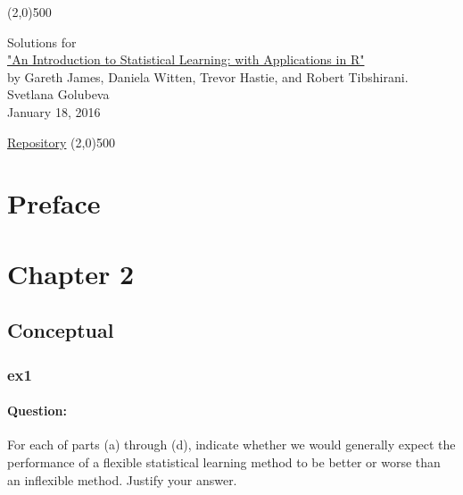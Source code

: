 \documentclass[a4paper,12pt,titlepage]{article} %
\begin{document}
\begin{titlepage}

\begin{center}
	\line(2,0){500}
\end{center}

\vspace{60pt}

\begin{center}	
	{\Large{Solutions for}}\\
	\vspace{20pt}
	\href{http://www.springer.com/us/book/9781461471370}{\Huge{"An Introduction to Statistical Learning: with Applications in R"}}\\
	\vspace{20pt}
	{\LARGE{by Gareth James, Daniela Witten, Trevor Hastie, and Robert Tibshirani.}}\\
	\vspace{20pt}
	Svetlana Golubeva\\
	\vspace{20pt}
	January 18, 2016
\end{center}

\vspace{\fill}
\begin{center}
	\href{https://github.com/attillax/ISL}{Repository}
	\line(2,0){500}
\end{center}

\end{titlepage}

\tableofcontents
\newpage
\section{Preface}

\newpage
\section{Chapter 2}
\subsection{Conceptual}
\subsubsection{ex1}
\paragraph{Question:} For each of parts (a) through (d), indicate whether we would generally expect the performance of a flexible statistical learning method to be better or worse than an inflexible method. Justify your answer.
\end{document}
